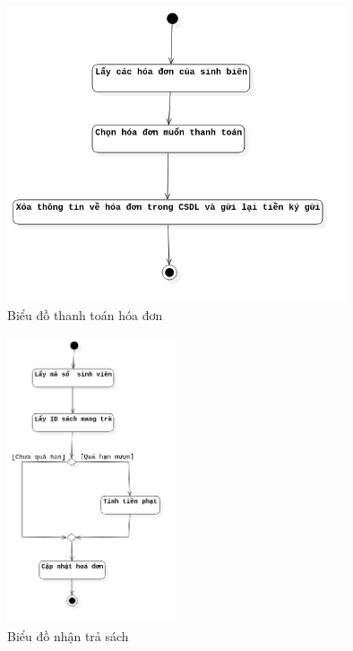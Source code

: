 \documentclass[12pt]{report}
\begin{document}
\begin{figure}[H]
\centering
\includegraphics[width=10cm]{figures/thanhtoan.png}
\caption{Biểu đồ thanh toán hóa đơn}
\end{figure}

\begin{figure}[H]
\centering
\includegraphics[width=5cm]{figures/nhantrasach.png}
\caption{Biểu đồ nhận trả sách}
\end{figure}
\end{document}

